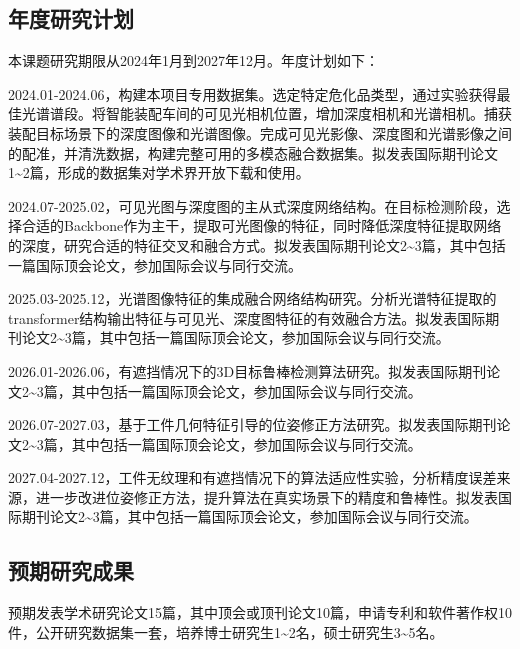 \documentclass[12pt]{article}
\begin{document}

\subsection{年度研究计划}

本课题研究期限从2024年1月到2027年12月。年度计划如下：  

2024.01-2024.06，构建本项目专用数据集。选定特定危化品类型，通过实验获得最佳光谱谱段。将智能装配车间的可见光相机位置，增加深度相机和光谱相机。捕获装配目标场景下的深度图像和光谱图像。完成可见光影像、深度图和光谱影像之间的配准，并清洗数据，构建完整可用的多模态融合数据集。拟发表国际期刊论文1\textasciitilde2篇，形成的数据集对学术界开放下载和使用。

2024.07-2025.02，可见光图与深度图的主从式深度网络结构。在目标检测阶段，选择合适的Backbone作为主干，提取可光图像的特征，同时降低深度特征提取网络的深度，研究合适的特征交叉和融合方式。拟发表国际期刊论文2\textasciitilde3篇，其中包括一篇国际顶会论文，参加国际会议与同行交流。

2025.03-2025.12，光谱图像特征的集成融合网络结构研究。分析光谱特征提取的transformer结构输出特征与可见光、深度图特征的有效融合方法。拟发表国际期刊论文2\textasciitilde3篇，其中包括一篇国际顶会论文，参加国际会议与同行交流。

2026.01-2026.06，有遮挡情况下的3D目标鲁棒检测算法研究。拟发表国际期刊论文2\textasciitilde3篇，其中包括一篇国际顶会论文，参加国际会议与同行交流。

2026.07-2027.03，基于工件几何特征引导的位姿修正方法研究。拟发表国际期刊论文2\textasciitilde3篇，其中包括一篇国际顶会论文，参加国际会议与同行交流。

2027.04-2027.12，工件无纹理和有遮挡情况下的算法适应性实验，分析精度误差来源，进一步改进位姿修正方法，提升算法在真实场景下的精度和鲁棒性。拟发表国际期刊论文2\textasciitilde3篇，其中包括一篇国际顶会论文，参加国际会议与同行交流。

\subsection{预期研究成果}

预期发表学术研究论文15篇，其中顶会或顶刊论文10篇，申请专利和软件著作权10件，公开研究数据集一套，培养博士研究生1\textasciitilde2名，硕士研究生3\textasciitilde5名。


\end{document}
